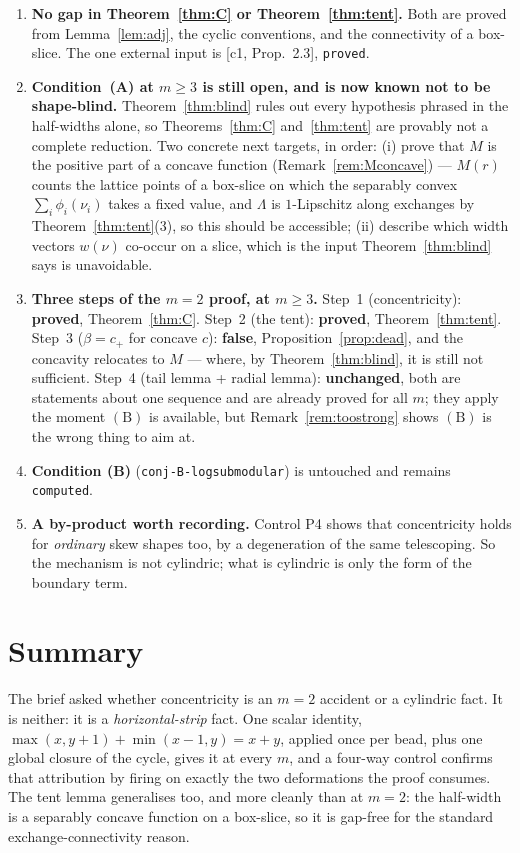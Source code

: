 \documentclass[11pt]{article}
\theoremstyle{definition}
\begin{document}
\begin{enumerate}
\item \textbf{No gap in Theorem~\ref{thm:C} or Theorem~\ref{thm:tent}.} Both are proved
from Lemma~\ref{lem:adj}, the cyclic conventions, and the connectivity of a box-slice. The
one external input is [c1, Prop.~2.3], \texttt{proved}.
\item \textbf{Condition~(A) at $m\ge3$ is still open, and is now known not to be
shape-blind.} Theorem~\ref{thm:blind} rules out every hypothesis phrased in the half-widths
alone, so Theorems~\ref{thm:C} and~\ref{thm:tent} are provably not a complete reduction.
Two concrete next targets, in order: (i) prove that $M$ is the positive part of a concave
function (Remark~\ref{rem:Mconcave}) --- $M(r)$ counts the lattice points of a box-slice on
which the separably convex $\sum_i\phi_i(\nu_i)$ takes a fixed value, and $\Lambda$ is
$1$-Lipschitz along exchanges by Theorem~\ref{thm:tent}(3), so this should be accessible;
(ii) describe which width vectors $w(\nu)$ co-occur on a slice, which is the input
Theorem~\ref{thm:blind} says is unavoidable.
\item \textbf{Three steps of the $m=2$ proof, at $m\ge3$.} Step~1 (concentricity):
\textbf{proved}, Theorem~\ref{thm:C}. Step~2 (the tent): \textbf{proved},
Theorem~\ref{thm:tent}. Step~3 ($\beta=c_+$ for concave $c$): \textbf{false},
Proposition~\ref{prop:dead}, and the concavity relocates to $M$ --- where, by
Theorem~\ref{thm:blind}, it is still not sufficient. Step~4 (tail lemma + radial lemma):
\textbf{unchanged}, both are statements about one sequence and are already proved for all
$m$; they apply the moment $(\mathrm B)$ is available, but
Remark~\ref{rem:toostrong} shows $(\mathrm B)$ is the wrong thing to aim at.
\item \textbf{Condition (B)} (\texttt{conj-B-logsubmodular}) is untouched and remains
\texttt{computed}.
\item \textbf{A by-product worth recording.} Control P4 shows that concentricity holds for
\emph{ordinary} skew shapes too, by a degeneration of the same telescoping. So the
mechanism is not cylindric; what is cylindric is only the form of the boundary term.
\end{enumerate}

\section{Summary}

The brief asked whether concentricity is an $m=2$ accident or a cylindric fact. It is
neither: it is a \emph{horizontal-strip} fact. One scalar identity,
$\max(x,y+1)+\min(x-1,y)=x+y$, applied once per bead, plus one global closure of the cycle,
gives it at every $m$, and a four-way control confirms that attribution by firing on exactly
the two deformations the proof consumes. The tent lemma generalises too, and more cleanly
than at $m=2$: the half-width is a separably concave function on a box-slice, so it is
gap-free for the standard exchange-connectivity reason.
\end{document}
